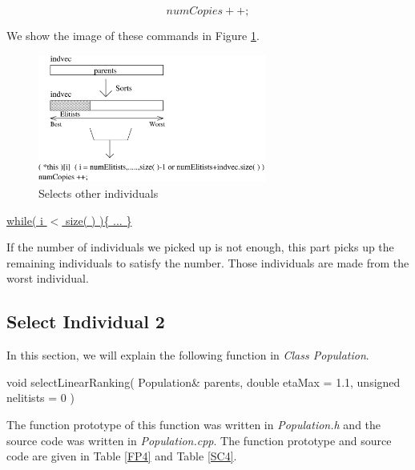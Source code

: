 \documentclass[twocolumn]{article}
\begin{document}
\begin{equation}
numCopies++;
\end{equation}

\noindent
We show the image of these commands in Figure
\ref{SelectOtherIndividuals}.

\begin{figure}[h]
\begin{center}
\includegraphics[width = 7.5cm]{selectMuLambda2.eps}
\caption{Selects other individuals}
\label{SelectOtherIndividuals}
\end{center}
\end{figure}

\noindent
\underline{while( i $<$ size( ) )\{ ... \}}

\noindent
If the number of individuals we picked up is not enough, this part
picks up the remaining individuals to satisfy the number. Those individuals are
made from the worst individual.

\subsection{Select Individual 2}

\noindent
In this section, we will explain the following function in {\em Class
Population}. 

\begin{center}
void selectLinearRanking( Population\& parents, double etaMax = 1.1,
unsigned nelitists = 0 )
\end{center}

\noindent
The function prototype of this function was written in {\em
Population.h} and the source code was written in {\em
Population.cpp}. The function prototype and source code are given in Table
\ref{FP4} and Table \ref{SC4}.
\end{document}
